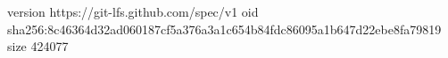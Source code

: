 version https://git-lfs.github.com/spec/v1
oid sha256:8c46364d32ad060187cf5a376a3a1c654b84fdc86095a1b647d22ebe8fa79819
size 424077
